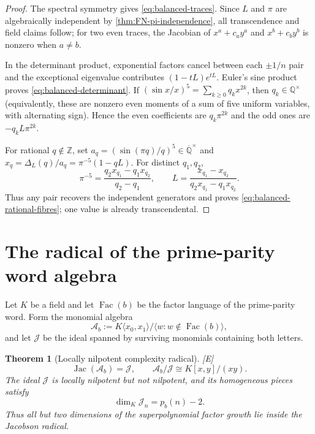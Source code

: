 \documentclass[11pt]{article}
\newtheorem{theorem}{Theorem}[section]
\theoremstyle{definition}
\theoremstyle{remark}
\newcommand{\status}[1]{\textnormal{\textcolor{accent}{\footnotesize[#1]}}}
\begin{document}
\begin{proof}
The spectral symmetry gives \eqref{eq:balanced-traces}.  Since $L$ and $\pi$ are
algebraically independent by \cref{thm:FN-pi-independence}, all transcendence and field
claims follow; for two even traces, the Jacobian of
$x^a+c_ay^a$ and $x^b+c_by^b$ is nonzero when $a\ne b$.

In the determinant product, exponential factors cancel between each $\pm1/n$ pair and
the exceptional eigenvalue contributes $(1-tL)e^{tL}$.  Euler's sine product proves
\eqref{eq:balanced-determinant}.  If
$(\sin x/x)^5=\sum_{k\ge0}q_kx^{2k}$, then
$q_k\in\mathbb Q^\times$ (equivalently, these are nonzero even moments of a sum of five
uniform variables, with alternating sign).  Hence the even coefficients are
$q_k\pi^{2k}$ and the odd ones are $-q_kL\pi^{2k}$.

For rational $q\notin\mathbb Z$, set
$a_q=(\sin(\pi q)/q)^5\in\overline{\mathbb Q}^{\times}$ and
$x_q=\Delta_L(q)/a_q=\pi^{-5}(1-qL)$.  For distinct $q_1,q_2$,
\[
 \pi^{-5}=\frac{q_2x_{q_1}-q_1x_{q_2}}{q_2-q_1},
 \qquad
 L=\frac{x_{q_1}-x_{q_2}}{q_2x_{q_1}-q_1x_{q_2}}.
\]
Thus any pair recovers the independent generators and proves
\eqref{eq:balanced-rational-fibres}; one value is already transcendental.
\end{proof}

\section{The radical of the prime-parity word algebra}

Let $K$ be a field and let $\operatorname{Fac}(b)$ be the factor language of the
prime-parity word.  Form the monomial algebra
\begin{equation}\label{eq:word-algebra}
 \mathcal A_b:=K\langle x_0,x_1\rangle/
 \langle w:w\notin\operatorname{Fac}(b)\rangle,
\end{equation}
and let $\mathcal J$ be the ideal spanned by surviving monomials containing both letters.

\begin{theorem}[Locally nilpotent complexity radical]
\label{thm:word-algebra-radical}
\status{E}
\begin{equation}\label{eq:word-algebra-radical}
 \operatorname{Jac}(\mathcal A_b)=\mathcal J,
 \qquad
 \mathcal A_b/\mathcal J\cong K[x,y]/(xy).
\end{equation}
The ideal $\mathcal J$ is locally nilpotent but not nilpotent, and its homogeneous
pieces satisfy
\begin{equation}\label{eq:radical-dimension}
 \dim_K\mathcal J_n=p_b(n)-2.
\end{equation}
Thus all but two dimensions of the superpolynomial factor growth lie inside the
Jacobson radical.
\end{theorem}
\end{document}
